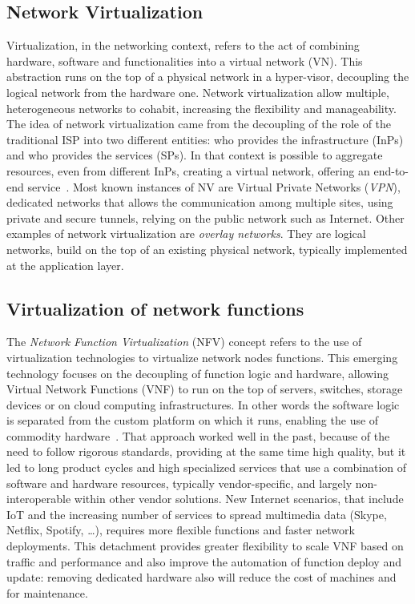 \subsection{Network Virtualization}
Virtualization, in the networking context, refers to the act of combining
hardware, software and functionalities into a virtual network (VN). This
abstraction runs on the top of a physical network in a hyper-visor, decoupling
the logical network from the hardware one. Network virtualization allow
multiple, heterogeneous networks to cohabit, increasing the flexibility and
manageability. The idea of network virtualization came from the decoupling of
the role of the traditional ISP into two different entities: who provides the
infrastructure (InPs) and who provides the services (SPs). In that context is
possible to aggregate resources, even from different InPs, creating a virtual
network, offering an end-to-end service~\cite{chowdhury2009network}. Most known
instances of NV are Virtual Private Networks (\emph{VPN}), dedicated networks
that allows the communication among multiple sites, using private and secure
tunnels, relying on the public network such as Internet. Other examples of
network virtualization are \emph{overlay networks}. They are logical networks,
build on the top of an existing physical network, typically implemented at the
application layer.

\subsection{Virtualization of network functions}
The \emph{Network Function Virtualization} (NFV) concept refers to the use of
virtualization technologies to virtualize network nodes functions. This emerging
technology focuses on the decoupling of function logic and hardware, allowing
Virtual Network Functions (VNF) to run on the top of servers, switches, storage
devices or on cloud computing infrastructures. In other words the software logic
is separated from the custom platform on which it runs, enabling the use of
commodity hardware~\cite{gray2016network}. That approach worked well in the
past, because of the need to follow rigorous standards, providing at the same
time high quality, but it led to long product cycles and high specialized
services that use a combination of software and hardware resources, typically
vendor-specific, and largely non-interoperable within other vendor
solutions. New Internet scenarios, that include IoT and the increasing number of
services to spread multimedia data (Skype, Netflix, Spotify, \dots), requires
more flexible functions and faster network deployments. This detachment provides
greater flexibility to scale VNF based on traffic and performance and also
improve the automation of function deploy and update: removing dedicated
hardware also will reduce the cost of machines and for maintenance.

